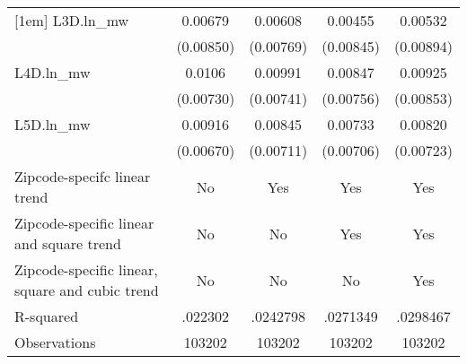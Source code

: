 {\begin{tabular}{l*{4}{c}}
[1em]
L3D.ln\_mw &  0.00679         &  0.00608         &  0.00455         &  0.00532         \\
          &(0.00850)         &(0.00769)         &(0.00845)         &(0.00894)         \\
[1em]
L4D.ln\_mw &   0.0106         &  0.00991         &  0.00847         &  0.00925         \\
          &(0.00730)         &(0.00741)         &(0.00756)         &(0.00853)         \\
[1em]
L5D.ln\_mw &  0.00916         &  0.00845         &  0.00733         &  0.00820         \\
          &(0.00670)         &(0.00711)         &(0.00706)         &(0.00723)         \\
\hline
Zipcode-specifc linear trend&       No         &      Yes         &      Yes         &      Yes         \\
Zipcode-specific linear and square trend&       No         &       No         &      Yes         &      Yes         \\
Zipcode-specific linear, square and cubic trend&       No         &       No         &       No         &      Yes         \\
R-squared &  .022302         & .0242798         & .0271349         & .0298467         \\
Observations&   103202         &   103202         &   103202         &   103202         \\
\hline\hline
\end{tabular}
}
